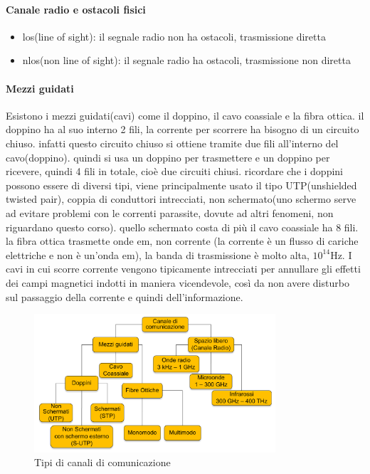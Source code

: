 \paragraph{Canale radio e ostacoli fisici}
\begin{itemize}
    \item los(line of sight): il segnale radio non ha ostacoli, trasmissione diretta
    \item nlos(non line of sight): il segnale radio ha ostacoli, trasmissione non diretta
\end{itemize}
\paragraph{Mezzi guidati}
Esistono i mezzi guidati(cavi) come il doppino, il cavo coassiale e la fibra ottica.
il doppino ha al suo interno 2 fili, la corrente per scorrere ha bisogno di un circuito chiuso. infatti questo circuito chiuso si ottiene tramite due fili all’interno del cavo(doppino).
quindi si usa un doppino per trasmettere e un doppino per ricevere, quindi 4 fili in totale, cioè due circuiti chiusi. ricordare che i doppini possono essere di diversi tipi, viene principalmente usato il tipo UTP(unshielded twisted pair), coppia di conduttori intrecciati, non schermato(uno schermo serve ad evitare problemi con le correnti parassite, dovute ad altri fenomeni, non riguardano questo corso). quello schermato costa di più
il cavo coassiale ha 8 fili.
la fibra ottica trasmette onde em, non corrente (la corrente è un flusso di cariche elettriche e non è un'onda em), la banda di trasmissione è molto alta, $10^{14}$Hz.
I cavi in cui scorre corrente vengono tipicamente intrecciati per annullare gli effetti dei campi magnetici indotti in maniera vicendevole, così da non avere disturbo sul passaggio della corrente e quindi dell'informazione.
\begin{figure}[h!]
    \centering
    \includegraphics[width=0.8\textwidth]{images/canali_comunicazione}
    \caption{Tipi di canali di comunicazione}
    \label{fig:canali_comunicazione}
\end{figure}
\newpage
